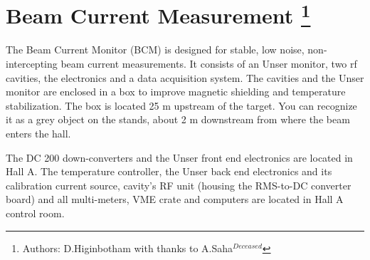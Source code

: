 \section[Beam Current Measurement]{Beam Current Measurement
\footnote{Authors: D.Higinbotham  with thanks to A.Saha$^{Deceased}$}
}

The Beam Current Monitor (BCM) is designed for stable, low noise, non-intercepting 
beam current measurements. It consists of an Unser monitor, two rf cavities, 
the electronics and a data acquisition system. The cavities and the Unser monitor 
are enclosed in a box to improve magnetic shielding and temperature stabilization.
The box is located 25 m upstream of the target. You can recognize it as a grey 
object on the stands, about 2 m downstream from where the beam enters the 
hall. 

The DC 200 down-converters and the Unser front end electronics are located in Hall 
A. The temperature controller, the Unser back end electronics and its calibration 
current source, cavity's RF unit (housing the RMS-to-DC converter board) and all 
multi-meters, VME crate and computers are located in Hall A control room.

